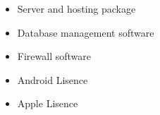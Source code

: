 \begin{itemize}
	\item Server and hosting package
	\item Database management software 
	\item Firewall software
	\item Android Lisence 
	\item Apple Lisence 
\end{itemize}

